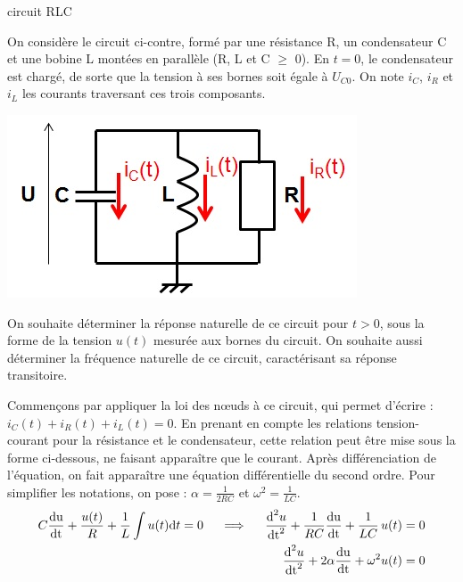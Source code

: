         \begin{exemple}{circuit RLC}
          \label{ex:circuit_rlc}
          
          \begin{minipage}[l]{0.7\linewidth}
            On considère le circuit ci-contre, formé par une résistance
            R, un condensateur C et une bobine L montées en parallèle
            (R, L et C $\geq$ 0). En $t= 0$, le condensateur est chargé,
            de sorte que la tension à ses bornes soit égale à
            $U_{C0}$. On note $i_{C}$, $i_{R}$ et $i_{L}$ les courants
            traversant ces trois composants.
          \end{minipage} \hfill
          \begin{minipage}[r]{0.4\linewidth}
            \includegraphics[scale=0.5]{images/circuit_RLC_reponse_naturelle.jpg}
          \end{minipage}
          
          On souhaite déterminer la réponse naturelle de ce circuit pour
          $t > 0$, sous la forme de la tension $u(t)$ mesurée aux bornes du
          circuit. On souhaite aussi déterminer la fréquence naturelle
          de ce circuit, caractérisant sa réponse transitoire.
          
          
          Commençons par appliquer la loi des
          nœuds à ce circuit, qui permet d'écrire :
          $i_{C}(t)+i_{R}(t)+i_{L}(t)=0$. En prenant en compte les
          relations tension-courant pour la résistance et le
          condensateur, cette relation peut être mise sous la forme
          ci-dessous, ne faisant apparaître que le courant. Après
          différenciation de l'équation, on fait apparaître une équation
          différentielle du second ordre. Pour simplifier les notations,
          on pose : $\alpha = \frac{1}{2RC} $ et
          $\omega^{2} = \frac{1}{LC}$.
          \begin{eqnarray*}
            C\frac{\mathrm{d{u}}}{\mathrm{d{t}}}+\frac{u(t)}{R}+\frac{1}{L}\int u(t) \mathrm{d{}} t=0 \;\;\;\;\implies\;\;\;\; \frac{\mathrm{d{}}^{2}u}{{\mathrm{d{t}}}^{2}}+\frac{1}{RC}\frac{\mathrm{d{u}}}{\mathrm{d{t}}}+\frac{1}{LC}\,u(t) = 0\\
            \frac{\mathrm{d{}}^{2}u}{{\mathrm{d{t}}}^{2}} + 2\alpha \frac{\mathrm{d{u}}}{\mathrm{d{t}}}+\omega^{2}u(t) = 0
          \end{eqnarray*}
          

\end{exemple}
